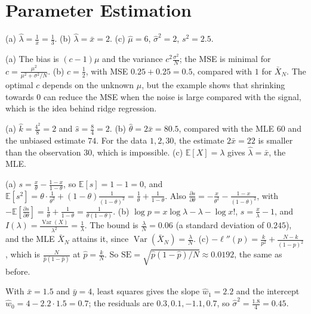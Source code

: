 \documentclass[11pt]{article}
\newcommand{\E}{\mathbb{E}}
\DeclareMathOperator{\Var}{Var}
\begin{document}
\section*{Parameter Estimation}

\begin{description}[leftmargin=0pt, itemsep=0.3em]
    \item[\ref{pr:mle-data}.] (a) $\hat\lambda = \frac{1}{\bar x} = \frac{1}{3}$. (b) $\hat\lambda = \bar x = 2$. (c) $\hat\mu = 6$, $\hat\sigma^2 = 2$, $s^2 = 2.5$.
    \item[\ref{pr:shrinkage}.] (a) The bias is $(c - 1)\mu$ and the variance $c^2\frac{\sigma^2}{N}$; the MSE is minimal for $c = \frac{\mu^2}{\mu^2 + \sigma^2/N}$. (b) $c = \frac{1}{2}$, with MSE $0.25 + 0.25 = 0.5$, compared with $1$ for $\bar X_N$. The optimal $c$ depends on the unknown $\mu$, but the example shows that shrinking towards $0$ can reduce the MSE when the noise is large compared with the signal, which is the idea behind ridge regression.
    \item[\ref{pr:mom}.] (a) $\hat k = \frac{4^2}{8} = 2$ and $\hat s = \frac{8}{4} = 2$. (b) $\hat\theta = 2\bar x = 80.5$, compared with the MLE $60$ and the unbiased estimate $74$. For the data $1, 2, 30$, the estimate $2\bar x = 22$ is smaller than the observation $30$, which is impossible. (c) $\E[X] = \lambda$ gives $\hat\lambda = \bar x$, the MLE.
    \item[\ref{pr:fisher}.] (a) $s = \frac{x}{\theta} - \frac{1 - x}{1 - \theta}$, so $\E[s] = 1 - 1 = 0$, and $\E[s^2] = \theta \cdot \frac{1}{\theta^2} + (1 - \theta)\frac{1}{(1 - \theta)^2} = \frac{1}{\theta} + \frac{1}{1 - \theta}$. Also $\frac{\partial s}{\partial\theta} = -\frac{x}{\theta^2} - \frac{1 - x}{(1 - \theta)^2}$, with $-\E[\frac{\partial s}{\partial\theta}] = \frac{1}{\theta} + \frac{1}{1 - \theta} = \frac{1}{\theta(1 - \theta)}$. (b) $\log p = x\log\lambda - \lambda - \log x!$, $s = \frac{x}{\lambda} - 1$, and $I(\lambda) = \frac{\Var(X)}{\lambda^2} = \frac{1}{\lambda}$. The bound is $\frac{\lambda}{N} = 0.06$ (a standard deviation of $0.245$), and the MLE $\bar X_N$ attains it, since $\Var(\bar X_N) = \frac{\lambda}{N}$. (c) $-\ell''(p) = \frac{k}{p^2} + \frac{N - k}{(1 - p)^2}$, which is $\frac{N}{\hat p(1 - \hat p)}$ at $\hat p = \frac{k}{N}$. So $\mathrm{SE} = \sqrt{\hat p(1 - \hat p)/N} \approx 0.0192$, the same as before.
    \item[\ref{pr:regression-mle}.] With $\bar x = 1.5$ and $\bar y = 4$, least squares gives the slope $\hat w_1 = 2.2$ and the intercept $\hat w_0 = 4 - 2.2 \cdot 1.5 = 0.7$; the residuals are $0.3, 0.1, -1.1, 0.7$, so $\hat\sigma^2 = \frac{1.8}{4} = 0.45$.

\end{description}
\end{document}
